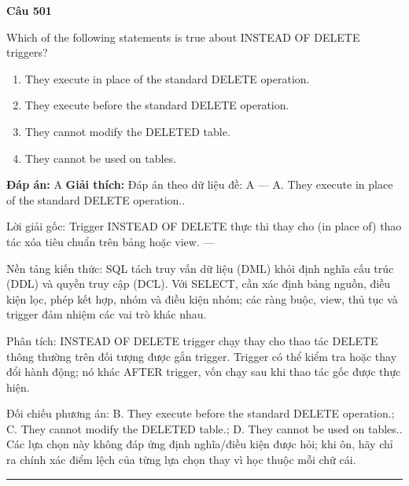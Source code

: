 \documentclass[11pt,a4paper]{article}
\newenvironment{question}[1]{%
  \par\vspace{1em}\noindent\textbf{\large Câu #1}\par\vspace{0.4em}
}{%
  \par\vspace{1em}\hrule\vspace{0.6em}
}
\newenvironment{choices}{%
  \begin{enumerate}[label=\textbf{\Alph*.},leftmargin=2.2em,itemsep=2pt,topsep=3pt]
}{%
  \end{enumerate}
}
\newcommand{\choice}{\item}
\begin{document}
\begin{question}{501}
Which of the following statements is true about INSTEAD OF DELETE triggers?
\begin{choices}
\choice They execute in place of the standard DELETE operation.
\choice They execute before the standard DELETE operation.
\choice They cannot modify the DELETED table.
\choice They cannot be used on tables.
\end{choices}
\textbf{Đáp án:} A
\textbf{Giải thích:} Đáp án theo dữ liệu đề: A — A. They execute in place of the standard DELETE operation..

Lời giải gốc: Trigger INSTEAD OF DELETE thực thi thay cho (in place of) thao tác xóa tiêu chuẩn trên bảng hoặc view. ---

Nền tảng kiến thức: SQL tách truy vấn dữ liệu (DML) khỏi định nghĩa cấu trúc (DDL) và quyền truy cập (DCL). Với SELECT, cần xác định bảng nguồn, điều kiện lọc, phép kết hợp, nhóm và điều kiện nhóm; các ràng buộc, view, thủ tục và trigger đảm nhiệm các vai trò khác nhau.

Phân tích: INSTEAD OF DELETE trigger chạy thay cho thao tác DELETE thông thường trên đối tượng được gắn trigger. Trigger có thể kiểm tra hoặc thay đổi hành động; nó khác AFTER trigger, vốn chạy sau khi thao tác gốc được thực hiện.

Đối chiếu phương án: B. They execute before the standard DELETE operation.; C. They cannot modify the DELETED table.; D. They cannot be used on tables.. Các lựa chọn này không đáp ứng định nghĩa/điều kiện được hỏi; khi ôn, hãy chỉ ra chính xác điểm lệch của từng lựa chọn thay vì học thuộc mỗi chữ cái.
\end{question}
\end{document}
